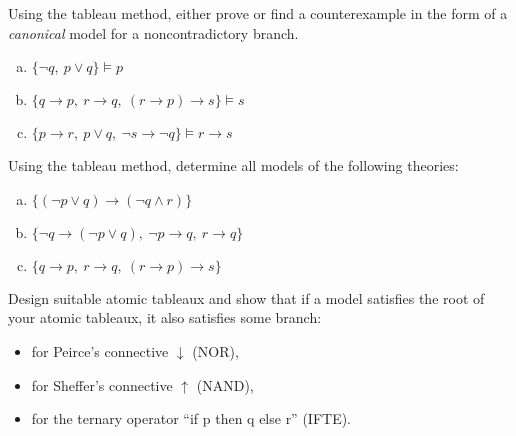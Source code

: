 \begin{problem}
    
    Using the tableau method, either prove or find a counterexample in the form of a \emph{canonical} model for a noncontradictory branch.
    \begin{enumerate}[(a)]
        \item $\{ \neg q,\ p \vee q\} \models p$
        \item $\{ q \to p,\ r \to q,\ (r \to p) \to s\} \models s$
        \item $\{ p \to r,\ p \vee q,\ \neg s \to \neg q\} \models r \to s$
    \end{enumerate}

\end{problem}


\begin{problem}

    Using the tableau method, determine all models of the following theories:
    \begin{enumerate}[(a)]
        \item $\{(\neg p \vee q) \to (\neg q \wedge r)\}$
        \item $\{\neg q \to (\neg p \vee q),\ \neg p \to q,\ r \to q\}$
        \item $\{ q \to p,\ r \to q,\ (r \to p) \to s\}$
    \end{enumerate}

\end{problem}


\begin{problem} 
    Design suitable atomic tableaux and show that if a model satisfies the root of your atomic tableaux, it also satisfies some branch:
    \begin{itemize}
        \item for Peirce's connective $\downarrow$ (NOR),
        \item for Sheffer's connective $\uparrow$ (NAND),
        \item for the ternary operator ``if p then q else r'' (IFTE).
    \end{itemize}  
    
\end{problem}


